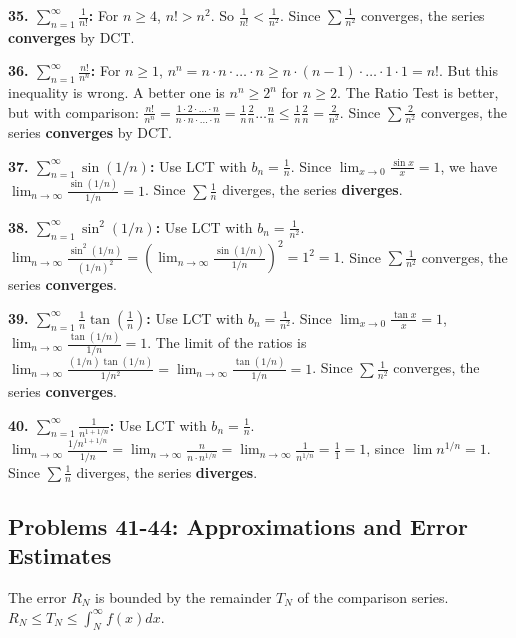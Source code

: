 \documentclass{article}
\begin{document}
\textbf{35. \(\sum_{n=1}^{\infty} \frac{1}{n!}\):} For \(n \ge 4\), \(n! > n^2\). So \(\frac{1}{n!} < \frac{1}{n^2}\). Since \(\sum \frac{1}{n^2}\) converges, the series \textbf{converges} by DCT.

\textbf{36. \(\sum_{n=1}^{\infty} \frac{n!}{n^n}\):} For \(n \ge 1\), \(n^n = n \cdot n \cdot \dots \cdot n \ge n \cdot (n-1) \cdot \dots \cdot 1 \cdot 1 = n!\). But this inequality is wrong. A better one is \(n^n \ge 2^n\) for \(n \ge 2\). The Ratio Test is better, but with comparison: \(\frac{n!}{n^n} = \frac{1 \cdot 2 \cdot \dots \cdot n}{n \cdot n \cdot \dots \cdot n} = \frac{1}{n} \frac{2}{n} \dots \frac{n}{n} \le \frac{1}{n} \frac{2}{n} = \frac{2}{n^2}\). Since \(\sum \frac{2}{n^2}\) converges, the series \textbf{converges} by DCT.

\textbf{37. \(\sum_{n=1}^{\infty} \sin(1/n)\):} Use LCT with \(b_n = \frac{1}{n}\). Since \(\lim_{x \to 0} \frac{\sin x}{x} = 1\), we have \(\lim_{n \to \infty} \frac{\sin(1/n)}{1/n} = 1\). Since \(\sum \frac{1}{n}\) diverges, the series \textbf{diverges}.

\textbf{38. \(\sum_{n=1}^{\infty} \sin^2(1/n)\):} Use LCT with \(b_n = \frac{1}{n^2}\). \(\lim_{n \to \infty} \frac{\sin^2(1/n)}{(1/n)^2} = (\lim_{n \to \infty} \frac{\sin(1/n)}{1/n})^2 = 1^2 = 1\). Since \(\sum \frac{1}{n^2}\) converges, the series \textbf{converges}.

\textbf{39. \(\sum_{n=1}^{\infty} \frac{1}{n} \tan(\frac{1}{n})\):} Use LCT with \(b_n = \frac{1}{n^2}\). Since \(\lim_{x \to 0} \frac{\tan x}{x} = 1\), \(\lim_{n \to \infty} \frac{\tan(1/n)}{1/n} = 1\). The limit of the ratios is \(\lim_{n \to \infty} \frac{(1/n)\tan(1/n)}{1/n^2} = \lim_{n \to \infty} \frac{\tan(1/n)}{1/n} = 1\). Since \(\sum \frac{1}{n^2}\) converges, the series \textbf{converges}.

\textbf{40. \(\sum_{n=1}^{\infty} \frac{1}{n^{1+1/n}}\):} Use LCT with \(b_n = \frac{1}{n}\). \(\lim_{n \to \infty} \frac{1/n^{1+1/n}}{1/n} = \lim_{n \to \infty} \frac{n}{n \cdot n^{1/n}} = \lim_{n \to \infty} \frac{1}{n^{1/n}} = \frac{1}{1} = 1\), since \(\lim n^{1/n}=1\). Since \(\sum \frac{1}{n}\) diverges, the series \textbf{diverges}.

\subsection{Problems 41-44: Approximations and Error Estimates}
The error \(R_N\) is bounded by the remainder \(T_N\) of the comparison series. \(R_N \le T_N \le \int_N^\infty f(x)dx\).
\end{document}
